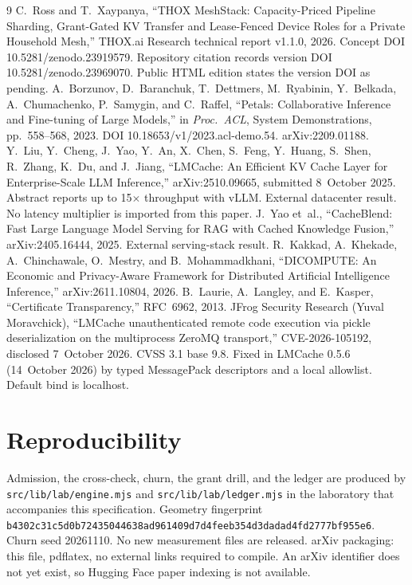 \documentclass[11pt]{article}
\begin{document}
\begin{thebibliography}{9}
 C.~Ross and T.~Xaypanya, ``THOX MeshStack: Capacity-Priced Pipeline Sharding, Grant-Gated KV Transfer and Lease-Fenced Device Roles for a Private Household Mesh,'' THOX.ai Research technical report v1.1.0, 2026. Concept DOI 10.5281/zenodo.23919579. Repository citation records version DOI 10.5281/zenodo.23969070. Public HTML edition states the version DOI as pending.
 A.~Borzunov, D.~Baranchuk, T.~Dettmers, M.~Ryabinin, Y.~Belkada, A.~Chumachenko, P.~Samygin, and C.~Raffel, ``Petals: Collaborative Inference and Fine-tuning of Large Models,'' in \emph{Proc.\ ACL}, System Demonstrations, pp.~558--568, 2023. DOI 10.18653/v1/2023.acl-demo.54. arXiv:2209.01188.
 Y.~Liu, Y.~Cheng, J.~Yao, Y.~An, X.~Chen, S.~Feng, Y.~Huang, S.~Shen, R.~Zhang, K.~Du, and J.~Jiang, ``LMCache: An Efficient KV Cache Layer for Enterprise-Scale LLM Inference,'' arXiv:2510.09665, submitted 8~October 2025. Abstract reports up to 15$\times$ throughput with vLLM. External datacenter result. No latency multiplier is imported from this paper.
 J.~Yao et~al., ``CacheBlend: Fast Large Language Model Serving for RAG with Cached Knowledge Fusion,'' arXiv:2405.16444, 2025. External serving-stack result.
 R.~Kakkad, A.~Khekade, A.~Chinchawale, O.~Mestry, and B.~Mohammadkhani, ``DICOMPUTE: An Economic and Privacy-Aware Framework for Distributed Artificial Intelligence Inference,'' arXiv:2611.10804, 2026.
 B.~Laurie, A.~Langley, and E.~Kasper, ``Certificate Transparency,'' RFC~6962, 2013.
 JFrog Security Research (Yuval Moravchick), ``LMCache unauthenticated remote code execution via pickle deserialization on the multiprocess ZeroMQ transport,'' CVE-2026-105192, disclosed 7~October 2026. CVSS 3.1 base 9.8. Fixed in LMCache 0.5.6 (14~October 2026) by typed MessagePack descriptors and a local allowlist. Default bind is localhost.
\end{thebibliography}

\section*{Reproducibility}
Admission, the cross-check, churn, the grant drill, and the ledger are produced by \texttt{src/lib/lab/engine.mjs} and \texttt{src/lib/lab/ledger.mjs} in the laboratory that accompanies this specification. Geometry fingerprint \texttt{b4302c31c5d0b72435044638ad961409d7d4feeb354d3dadad4fd2777bf955e6}. Churn seed 20261110. No new measurement files are released. arXiv packaging: this file, pdflatex, no external links required to compile. An arXiv identifier does not yet exist, so Hugging Face paper indexing is not available.
\end{document}
